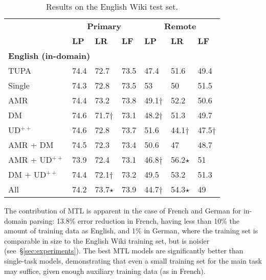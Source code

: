 \documentclass[11pt,a4paper]{article}
\begin{document}
\begin{table}[t]
\centering
\small
\setlength\tabcolsep{3pt}
\begin{tabular}{l|lll|lll}
& \multicolumn{3}{c|}{\footnotesize \bf Primary} & \multicolumn{3}{c}{\footnotesize \bf Remote} \\
& \footnotesize \textbf{LP} & \footnotesize \textbf{LR} & \footnotesize \textbf{LF}
& \footnotesize \textbf{LP} & \footnotesize \textbf{LR} & \footnotesize \textbf{LF} \\
\hline
\multicolumn{4}{l|}{\small \bf English (in-domain)} & \\
\footnotesize TUPA
& 74.4 & 72.7 & 73.5 & 47.4 & 51.6 & 49.4 \\
\footnotesize Single
& 74.3 & 72.8 & 73.5 & 53 & 50 & 51.5 \\
\cline{1-1}
\footnotesize AMR
& 74.4 & 73.2 & 73.8 & 49.1$\dagger$ & 52.2 & 50.6 \\
\footnotesize DM
& 74.6 & 71.7$\dagger$ & 73.1 & 48.2$\dagger$ & 51.3 & 49.7 \\
\footnotesize UD$^{++}$
& 74.6 & 72.8 & 73.7 & 51.6 & 44.1$\dagger$ & 47.5$\dagger$ \\
\footnotesize AMR + DM
& 74.5 & 72.3 & 73.4 & 50.6 & 47 & 48.7 \\
\footnotesize AMR + UD$^{++}$
& 73.9 & 72.4 & 73.1 & 46.8$\dagger$ & 56.2$\star$ & 51 \\
\footnotesize DM + UD$^{++}$
& 74.4 & 72.1$\dagger$ & 73.2 & 49.5 & 53.2 & 51.3 \\
\footnotesize All
& 74.2 & 73.7$\star$ & 73.9 & 44.7$\dagger$ & 54.3$\star$ & 49
\end{tabular}
\caption{
Results on the English Wiki test set.
}
\label{tab:id_results}
\end{table}


The contribution of MTL is apparent in the case of French and German
for in-domain parsing:
13.8\% error reduction in French, having less than 10\% the amount of training data as English,
and 1\% in German, where the training set is comparable in size to the English Wiki training set,
but is noisier (see~\S\ref{sec:experiments}).
The best MTL models are significantly better than single-task models,
demonstrating that even a small training set for the main task may suffice,
given enough auxiliary training data (as in French).
\end{document}
